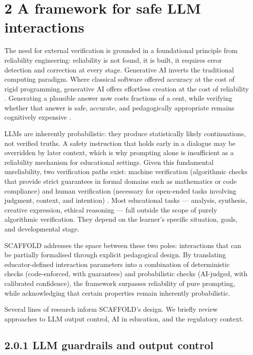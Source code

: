\documentclass[fleqn,10pt]{wlscirep}
\begin{document}
\section*{2 A framework for safe LLM interactions}

The need for external verification is grounded in a foundational principle from reliability engineering: reliability is not found, it is built, it requires error detection and correction at every stage. Generative AI inverts the traditional computing paradigm. Where classical software offered accuracy at the cost of rigid programming, generative AI offers effortless creation at the cost of reliability \cite{Xu2025, BardynWhitepaper2025}. Generating a plausible answer now costs fractions of a cent, while verifying whether that answer is safe, accurate, and pedagogically appropriate remains cognitively expensive \cite{BardynWhitepaper2025, Xu2025}.

LLMs are inherently probabilistic: they produce statistically likely continuations, not verified truths. A safety instruction that holds early in a dialogue may be overridden by later context, which is why prompting alone is insufficient as a reliability mechanism for educational settings. Given this fundamental unreliability, two verification paths exist: machine verification (algorithmic checks that provide strict guarantees in formal domains such as mathematics or code compliance) \cite{Gou2024, Madaan2023} and human verification (necessary for open-ended tasks involving judgment, context, and intention) \cite{Korthals2026}. Most educational tasks --- analysis, synthesis, creative expression, ethical reasoning --- fall outside the scope of purely algorithmic verification. They depend on the learner's specific situation, goals, and developmental stage.

SCAFFOLD addresses the space between these two poles: interactions that can be partially formalised through explicit pedagogical design. By translating educator-defined interaction parameters into a combination of deterministic checks (code-enforced, with guarantees) and probabilistic checks (AI-judged, with calibrated confidence), the framework surpasses reliability of pure prompting, while acknowledging that certain properties remain inherently probabilistic.

Several lines of research inform SCAFFOLD's design. We briefly review approaches to LLM output control, AI in education, and the regulatory context.

\subsection*{2.0.1 LLM guardrails and output control}
\end{document}
